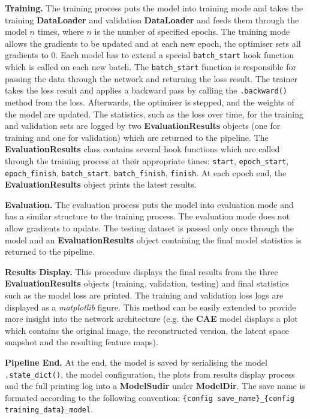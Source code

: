 \textbf{Training.} The training process puts the model into training mode and takes the training \textbf{DataLoader} and validation \textbf{DataLoader} and feeds them through the model $n$ times, where $n$ is the number of specified epochs. The training mode allows the gradients to be updated and at each new epoch, the optimiser sets all gradients to 0. Each model has to extend a special \texttt{batch\_start} hook function which is called on each new batch. The \texttt{batch\_start} function is responsible for passing the data through the network and returning the loss result. The trainer takes the loss result and applies a backward pass by calling the \texttt{.backward()} method from the loss. Afterwards, the optimiser is stepped, and the weights of the model are updated. The statistics, such as the loss over time, for the training and validation sets are logged by two \textbf{EvaluationResults} objects (one for training and one for validation) which are returned to the pipeline. The \textbf{EvaluationResults} class contains several hook functions which are called through the training process at their appropriate times: \texttt{start}, \texttt{epoch\_start}, \texttt{epoch\_finish}, \texttt{batch\_start}, \texttt{batch\_finish}, \texttt{finish}. At each epoch end, the \textbf{EvaluationResults} object prints the latest results.

\textbf{Evaluation.} The evaluation process puts the model into evaluation mode and has a similar structure to the training process. The evaluation mode does not allow gradients to update. The testing dataset is passed only once through the model and an \textbf{EvaluationResults} object containing the final model statistics is returned to the pipeline.

\textbf{Results Display.} This procedure displays the final results from the three \textbf{EvaluationResults} objects (training, validation, testing) and final statistics such as the model loss are printed. The training and validation loss logs are displayed as a \textit{matplotlib} \cite{Hunter:2007} figure. This method can be easily extended to provide more insight into the network architecture (e.g. the \textbf{CAE} model displays a plot which contains the original image, the reconstructed version, the latent space snapshot and the resulting feature maps).

\textbf{Pipeline End.} At the end, the model is saved by serialising the model \texttt{.state\_dict()}, the model configuration, the plots from results display process and the full printing log into a \textbf{ModelSudir} under \textbf{ModelDir}. The save name is formated according to the following convention: \texttt{\{config save\_name\}\_\{config training\_data\}\_model}.

